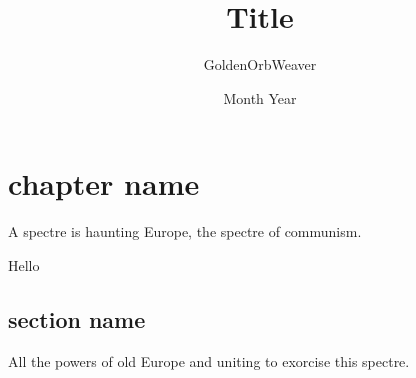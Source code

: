 \documentclass{article}
\title{\textbf{Title}}
\author{GoldenOrbWeaver}
\date{Month Year}
\begin{document}
\maketitle

\tableofcontents{\textbf{}}

\pagebreak

\pagestyle{fancy}
\fancyhead{}
\fancyhead[L]{\thetitle}

\section{chapter name}
A spectre is haunting Europe, the spectre of communism.
\begin{examplebox}
    Hello
\end{examplebox}

\subsection{section name}
All the powers of old Europe and uniting to exorcise this spectre.
\end{document}

